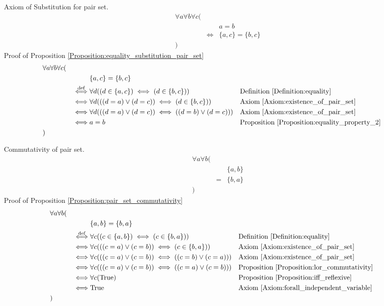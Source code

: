 \begin{prop}
\label{Proposition:equality_substitution_pair_set}
Axiom of Substitution for pair set.
\begin{align*}
& \forall a \forall b \forall c ( \\
& & & a = b \\
& & \iff & \{ a , c \} = \{ b , c \} \\
& )
\end{align*}
Proof of Proposition \ref{Proposition:equality_substitution_pair_set}
\begin{align*}
& \forall a \forall b \forall c ( \\
& & & \{ a , c \} = \{ b , c \} \\
& & \overset{\operatorname{def}}{\iff} & \forall d ((d \in \{ a , c \}) \iff (d \in \{ b , c \}))
& & \text{Definition \ref{Definition:equality}} \\
& & \iff & \forall d (((d = a) \lor (d = c)) \iff (d \in \{ b , c \}))
& & \text{Axiom \ref{Axiom:existence_of_pair_set}} \\
& & \iff & \forall d (((d = a) \lor (d = c)) \iff ((d = b) \lor (d = c)))
& & \text{Axiom \ref{Axiom:existence_of_pair_set}} \\
& & \iff & a = b
& & \text{Proposition \ref{Proposition:equality_property_2}} \\
& )
\end{align*}
\end{prop}

\begin{prop}
\label{Proposition:pair_set_commutativity}
Commutativity of pair set.
\begin{align*}
& \forall a \forall b ( \\
& & & \{ a , b \} \\
& & = & \{ b , a \} \\
& )
\end{align*}
Proof of Proposition \ref{Proposition:pair_set_commutativity}
\begin{align*}
& \forall a \forall b ( \\
& & & \{ a , b \} = \{ b , a \} \\
& & \overset{\operatorname{def}}{\iff} & \forall c ((c \in \{ a , b \}) \iff (c \in \{ b , a \}))
& & \text{Definition \ref{Definition:equality}} \\
& & \iff & \forall c (((c = a) \lor (c = b)) \iff (c \in \{ b , a \}))
& & \text{Axiom \ref{Axiom:existence_of_pair_set}} \\
& & \iff & \forall c (((c = a) \lor (c = b)) \iff ((c = b) \lor (c = a)))
& & \text{Axiom \ref{Axiom:existence_of_pair_set}} \\
& & \iff & \forall c (((c = a) \lor (c = b)) \iff ((c = a) \lor (c = b)))
& & \text{Proposition \ref{Proposition:lor_commutativity}} \\
& & \iff & \forall c (\text{True})
& & \text{Proposition \ref{Proposition:iff_reflexive}} \\
& & \iff & \text{True}
& & \text{Axiom \ref{Axiom:forall_independent_variable}} \\
& )
\end{align*}
\end{prop}


